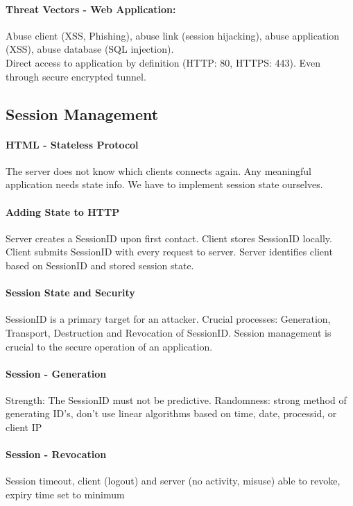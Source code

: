 \paragraph{Threat Vectors - Web Application:} Abuse client (XSS, Phishing), abuse link (session hijacking), abuse application (XSS), abuse database (SQL injection). \\
Direct access to application by definition (HTTP: 80, HTTPS: 443). Even through secure encrypted tunnel.

\subsection{Session Management}

\paragraph{HTML - Stateless Protocol} The server does not know which clients connects again. Any meaningful application needs state info. We have to implement session state ourselves.

\paragraph{Adding State to HTTP} Server creates a SessionID upon first contact. Client stores SessionID locally. Client submits SessionID with every request to server. Server identifies client based on SessionID and stored session state.

\paragraph{Session State and Security}
SessionID is a primary target for an attacker. Crucial processes: Generation, Transport, Destruction and Revocation of SessionID. Session management is crucial to the secure operation of an application.


\paragraph{Session - Generation}
Strength: The SessionID must not be predictive. Randomness: strong method of generating ID's, don't use linear algorithms based on time, date, processid, or client IP

\paragraph{Session - Revocation}
Session timeout, client (logout) and server (no activity, misuse) able to revoke, expiry time set to minimum

